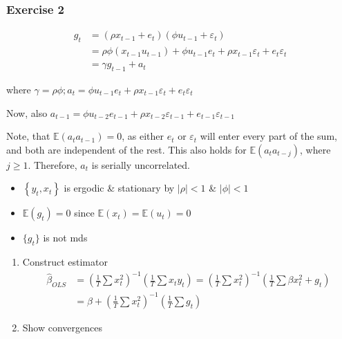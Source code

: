 {{\subsubsection*{Exercise 2}

\begin{enumerate}[label=(\alph*)]
{\item 
$$
\begin{aligned}
g_{t} & =\left(\rho x_{t-1}+e_{t}\right)\left(\phi u_{t-1}+\varepsilon_{t}\right) \\
& =\rho \phi\left(x_{t-1} u_{t-1}\right)+\phi u_{t-1} e_{t}+\rho x_{t-1} \varepsilon_{t}+e_{t} \varepsilon_{t} \\
& =\gamma g_{t-1}+a_{t}
\end{aligned}
$$

where $\gamma=\rho \phi ; a_{t}=\phi u_{t-1} e_{t}+\rho x_{t-1} \varepsilon_{t}+e_{t} \varepsilon_{t}$

Now, also $a_{t-1}=\phi u_{t-2} e_{t-1}+\rho x_{t-2} \varepsilon_{t-1}+e_{t-1} \varepsilon_{t-1}$

Note, that $\mathbb{E}\left(a_{t} a_{t-1}\right)=0$, as either $e_{t}$ or $\varepsilon_{t}$ will enter every part of the sum, and both are independent of the rest. This also holds for $\mathbb{E}\left(a_{t} a_{t-j}\right)$, where $j \geqslant 1$. Therefore, $a_t$ is serially uncorrelated.
}
{\item 
\begin{itemize}
    \item $\left\{y_{t}, x_{t}\right\}$ is ergodic \& stationary by $|\rho|<1$ \& $|\phi|<1$ 
    \item $\mathbb{E}\left(g_{t}\right)=0$ since $\mathbb{E}\left(x_{t}\right)=\mathbb{E}\left(u_{t}\right)=0$
    \item $\{g_t\}$ is not mds
\end{itemize}

\begin{enumerate}[label=(\arabic*)]
\item Construct estimator
$$
\begin{aligned}
\hat{\beta}_{OLS} & =\left(\frac{1}{T} \sum x_{t}^{2}\right)^{-1}\left(\frac{1}{T} \sum x_{t} y_{t}\right)=\left(\frac{1}{T} \sum x_{t}^{2}\right)^{-1}\left(\frac{1}{T} \sum \beta x_{t}^{2}+g_{t}\right) \\
& =\beta+\left(\frac{1}{T} \sum x_{t}^{2}\right)^{-1}\left(\frac{1}{T} \sum g_{t}\right)
\end{aligned}
$$
\item Show convergences


\end{enumerate}}
\end{enumerate}}}
